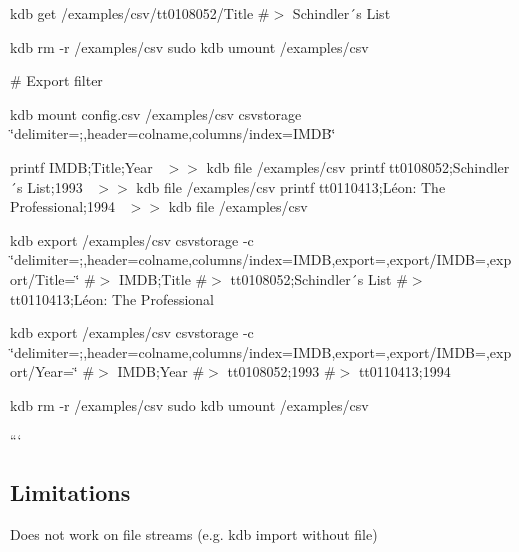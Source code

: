 kdb get /examples/csv/tt0108052/\+Title \#$>$ Schindler´s List

kdb rm -\/r /examples/csv sudo kdb umount /examples/csv


\begin{DoxyCode}
# Export filter
\end{DoxyCode}
 kdb mount config.\+csv /examples/csv csvstorage \char`\"{}delimiter=;,header=colname,columns/index=\+I\+M\+D\+B\char`\"{}

printf \textquotesingle{}I\+M\+DB;Title;Year~\newline
\textquotesingle{} $>$$>$ {\ttfamily kdb file /examples/csv} printf \textquotesingle{}tt0108052;Schindler´s List;1993~\newline
\textquotesingle{} $>$$>$ {\ttfamily kdb file /examples/csv} printf \textquotesingle{}tt0110413;Léon\+: The Professional;1994~\newline
\textquotesingle{} $>$$>$ {\ttfamily kdb file /examples/csv}

kdb export /examples/csv csvstorage -\/c \char`\"{}delimiter=;,header=colname,columns/index=\+I\+M\+D\+B,export=,export/\+I\+M\+D\+B=,export/\+Title=\char`\"{} \#$>$ I\+M\+DB;Title \#$>$ tt0108052;Schindler´s List \#$>$ tt0110413;Léon\+: The Professional

kdb export /examples/csv csvstorage -\/c \char`\"{}delimiter=;,header=colname,columns/index=\+I\+M\+D\+B,export=,export/\+I\+M\+D\+B=,export/\+Year=\char`\"{} \#$>$ I\+M\+DB;Year \#$>$ tt0108052;1993 \#$>$ tt0110413;1994

kdb rm -\/r /examples/csv sudo kdb umount /examples/csv

```

\subsection*{Limitations}


\begin{DoxyItemize}
\item Does not work on file streams (e.\+g. {\ttfamily kdb import} without file) 
\end{DoxyItemize}